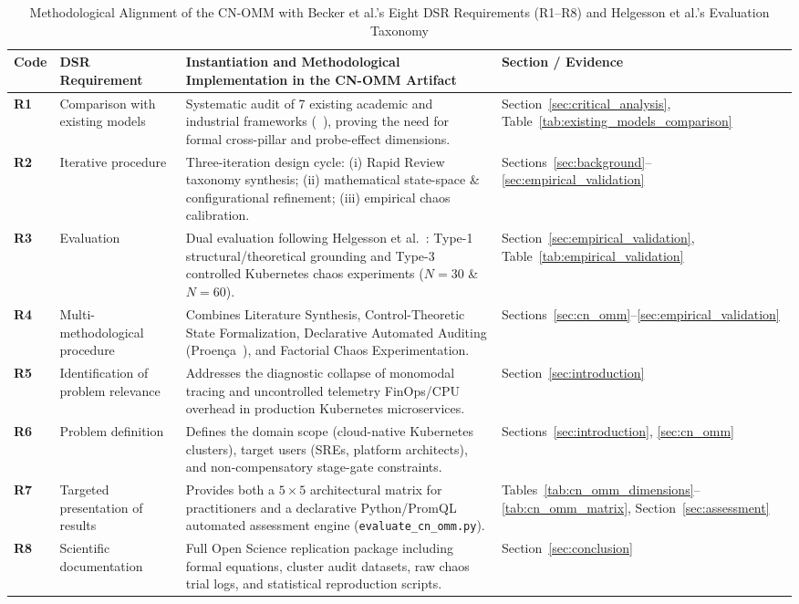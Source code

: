 \begin{table}[t]
\centering
\caption{Methodological Alignment of the CN-OMM with Becker et al.'s Eight DSR Requirements (R1--R8) and Helgesson et al.'s Evaluation Taxonomy}
\label{tab:becker_evaluation}
\footnotesize
\setlength{\tabcolsep}{4.5pt}
\renewcommand{\arraystretch}{1.18}
\begin{tabularx}{\textwidth}{l l >{\raggedright\arraybackslash}X l}
\toprule
\textbf{Code} & \textbf{DSR Requirement~\cite{becker_2009}} & \textbf{Instantiation and Methodological Implementation in the CN-OMM Artifact} & \textbf{Section / Evidence} \\
\midrule
\textbf{R1} & Comparison with existing models & Systematic audit of 7 existing academic and industrial frameworks (~\cite{duarte_2013, patel_2025, amgothu_2025, grafana_omm_2024, dynatrace_omm_2024, cncf_obs_2024, wwt_omm_2025}), proving the need for formal cross-pillar and probe-effect dimensions. & Section~\ref{sec:critical_analysis}, Table~\ref{tab:existing_models_comparison} \\
\textbf{R2} & Iterative procedure & Three-iteration design cycle: (i) Rapid Review taxonomy synthesis; (ii) mathematical state-space \& configurational refinement; (iii) empirical chaos calibration. & Sections~\ref{sec:background}--\ref{sec:empirical_validation} \\
\textbf{R3} & Evaluation & Dual evaluation following Helgesson et al.~\cite{helgesson_2012}: Type-1 structural/theoretical grounding and Type-3 controlled Kubernetes chaos experiments ($N=30$ \& $N=60$). & Section~\ref{sec:empirical_validation}, Table~\ref{tab:empirical_validation} \\
\textbf{R4} & Multi-methodological procedure & Combines Literature Synthesis, Control-Theoretic State Formalization, Declarative Automated Auditing (Proen\c{c}a~\cite{proenca_2016_rcis}), and Factorial Chaos Experimentation. & Sections~\ref{sec:cn_omm}--\ref{sec:empirical_validation} \\
\textbf{R5} & Identification of problem relevance & Addresses the diagnostic collapse of monomodal tracing and uncontrolled telemetry FinOps/CPU overhead in production Kubernetes microservices. & Section~\ref{sec:introduction} \\
\textbf{R6} & Problem definition & Defines the domain scope (cloud-native Kubernetes clusters), target users (SREs, platform architects), and non-compensatory stage-gate constraints. & Sections~\ref{sec:introduction}, \ref{sec:cn_omm} \\
\textbf{R7} & Targeted presentation of results & Provides both a $5\times5$ architectural matrix for practitioners and a declarative Python/PromQL automated assessment engine (\texttt{evaluate\_cn\_omm.py}). & Tables~\ref{tab:cn_omm_dimensions}--\ref{tab:cn_omm_matrix}, Section~\ref{sec:assessment} \\
\textbf{R8} & Scientific documentation & Full Open Science replication package including formal equations, cluster audit datasets, raw chaos trial logs, and statistical reproduction scripts. & Section~\ref{sec:conclusion} \\
\bottomrule
\end{tabularx}
\end{table}
